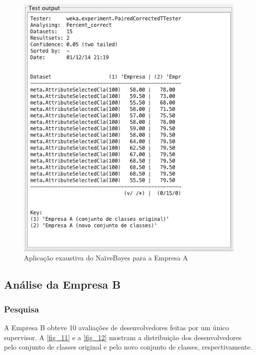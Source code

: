 \begin{figure}[p]
	\centering
	\includegraphics[width=\textwidth]{figs/empresa_a/exaustive-naivebayes.png}
	\caption{\label{fig_10}Aplicação exaustiva do NaïveBayes para a Empresa A}
\end{figure}
\clearpage

\subsection{Análise da Empresa B}

\subsubsection{Pesquisa}

A Empresa B obteve 10 avaliações de desenvolvedores feitas por um único supervisor. A \autoref{fig_11} e a \autoref{fig_12} mostram a distribuição dos desenvolvedores pelo conjunto de classes original e pelo novo conjunto de classes, respectivamente.

